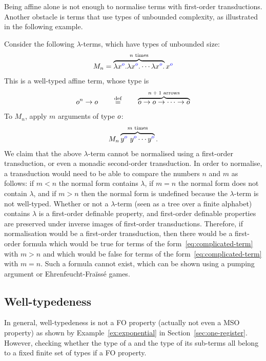 Being affine alone is not enough to normalise terms with first-order transductions. Another obstacle is terms that use types of unbounded complexity, as illustrated in the following example. 

\begin{example}\label{ex:affine-not-enough}
Consider the following $\lambda$-terms, which have types of 
unbounded size: 
\begin{align*}
M_n = \overbrace{\lambda {x}^{\color{blue}{o}}. \lambda {x}^{\color{blue}{o}}. \cdots \lambda {x}^{\color{blue}{o}}.}^{\text{$n$ times}} {x}^{\color{blue}{o}}
\end{align*}
This is a well-typed affine term, whose type is 
\begin{align*}
o^n \to o \qquad \stackrel{\text{def}}= \qquad  \overbrace{o \to o \to \cdots \to o}^{\text{$n+1$ arrows}}
\end{align*}
    To $M_n$, apply  $m$ arguments of type $o$:
    \begin{align}\label{eq:complicated-term}
    M_n \overbrace{{y}^{\color{blue}{o}} \ {y}^{\color{blue}{o}} \cdots {y}^{\color{blue}{o}} }^{\text{$m$ times}}.
    \end{align}
    We claim that the above $\lambda$-term cannot be normalised using a first-order transduction, or even a monadic second-order transduction. In order to normalise, a transduction would need to be able to compare the numbers $n$ and $m$ as follows:  if $m < n$  the normal form contains $\lambda$, if $m=n$  the normal form does not contain $\lambda$, and if $m > n$ then the normal form is undefined because the $\lambda$-term is not well-typed.  Whether or not a $\lambda$-term (seen as a tree over a finite alphabet) contains $\lambda$ is a first-order definable property, and first-order definable properties are preserved under inverse images of first-order transductions. Therefore, if normalisation would be a first-order transduction,
then there would be a first-order formula which would be true for terms of the form~\eqref{eq:complicated-term} with $m>n$ and which would be false for terms of the form~\eqref{eq:complicated-term} with $m=n$. Such a formula cannot exist, which can be shown using a pumping argument or Ehrenfeucht-Fra\"iss\'e games. 
\end{example}

\subsection{Well-typedeness}
In general, well-typedeness is not a FO property (actually not even a MSO property) as shown by Example~\ref{ex:exponential} in Section~\ref{sec:one-register}.
However, checking whether the type of a \lambdaterm and the type of its sub-terms all belong to a fixed finite set of types if a FO property. 

